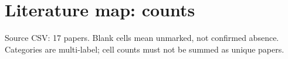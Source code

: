 \documentclass[10pt]{article}
\begin{document}
\section*{Literature map: counts}
Source CSV: 17 papers. Blank cells mean unmarked, not confirmed absence. Categories are multi-label; cell counts must not be summed as unique papers.
\par\smallskip 



\end{document}
